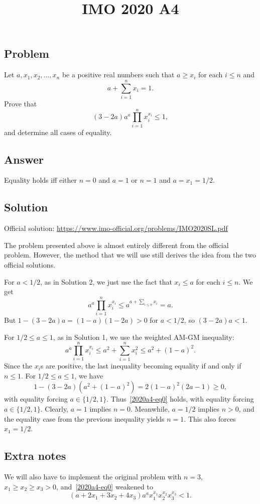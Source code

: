 \documentclass{article}
\title{IMO 2020 A4}
\author{}
\date{}
\begin{document}
\maketitle



\subsection*{Problem}

Let $a, x_1, x_2, \ldots, x_n$ be a positive real numbers such that $a \geq x_i$ for each $i \leq n$ and
\[ a + \sum_{i = 1}^n x_i = 1. \]
Prove that
\[ (3 - 2a) a^a \prod_{i = 1}^n x_i^{x_i} \leq 1, \tag{*}\label{2020a4-eq0} \]
    and determine all cases of equality.



\subsection*{Answer}

Equality holds iff either $n = 0$ and $a = 1$ or $n = 1$ and $a = x_1 = 1/2$.



\subsection*{Solution}

Official solution: \url{https://www.imo-official.org/problems/IMO2020SL.pdf}

The problem presented above is almost entirely different from the official problem.
However, the method that we will use still derives the idea from the two official solutions.

For $a < 1/2$, as in Solution 2, we just use the fact that $x_i \leq a$ for each $i \leq n$.
We get
\[ a^a \prod_{i = 1}^n x_i^{x_i} \leq a^{a + \sum_{i \leq n} x_i} = a. \]
But $1 - (3 - 2a) a = (1 - a)(1 - 2a) > 0$ for $a < 1/2$, so $(3 - 2a) a < 1$.

For $1/2 \leq a \leq 1$, as in Solution 1, we use the weighted AM-GM inequality:
\[ a^a \prod_{i = 1}^n x_i^{x_i} \leq a^2 + \sum_{i = 1}^n x_i^2 \leq a^2 + (1 - a)^2. \]
Since the $x_i$s are positive, the last inequality becoming equality if and only if $n \leq 1$.
For $1/2 \leq a \leq 1$, we have
\[ 1 - (3 - 2a) (a^2 + (1 - a)^2) = 2 (1 - a)^2 (2a - 1) \geq 0, \]
    with equality forcing $a \in \{1/2, 1\}$.
Thus~\eqref{2020a4-eq0} holds, with equality forcing $a \in \{1/2, 1\}$.
Clearly, $a = 1$ implies $n = 0$.
Meanwhile, $a = 1/2$ implies $n > 0$, and the equality case from the previous inequality yields $n = 1$.
This also forces $x_1 = 1/2$.



\subsection*{Extra notes}

We will also have to implement the original problem with $n = 3$, $x_1 \geq x_2 \geq x_3 > 0$, and~\eqref{2020a4-eq0} weakened to
\[ (a + 2x_1 + 3x_2 + 4x_3) a^a x_1^{x_1} x_2^{x_2} x_3^{x_3} < 1. \]
\end{document}
